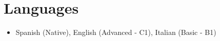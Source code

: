 \documentclass[letterpaper,11pt]{article}
\newcommand{\resumeItem}[1]{
  \item\small{
    {#1 \vspace{-2pt}}
  }
}
\newcommand{\resumeItemListStart}{\begin{itemize}}
\newcommand{\resumeItemListEnd}{\end{itemize}\vspace{-5pt}}
\begin{document}
%
\section{Languages}
\resumeItemListStart
    \resumeItem{Spanish (Native), English (Advanced - C1), Italian (Basic - B1)}
\resumeItemListEnd


\end{document}
